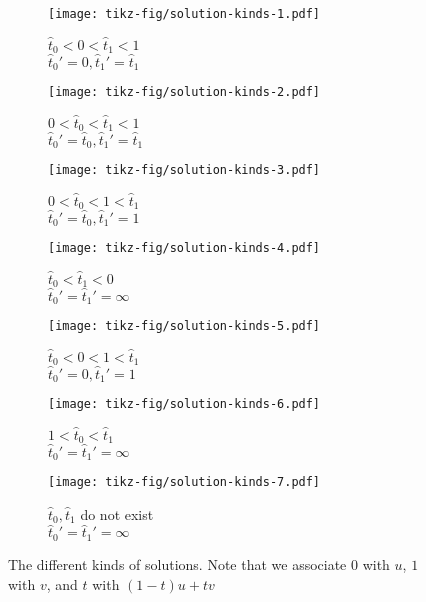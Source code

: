 \begin{figure}
    \centering
    \begin{subfigure}[t]{0.3\textwidth}
      \texttt{[image: tikz-fig/solution-kinds-1.pdf]}
      \caption{\(\hat t_0 < 0 < \hat t_1 < 1\) \\
        \(\hat t_0' = 0, \hat t_1' = \hat t_1\)}
    \end{subfigure}
    \hfill
    \begin{subfigure}[t]{0.3\textwidth}
      \texttt{[image: tikz-fig/solution-kinds-2.pdf]}
      \caption{\(0 < \hat t_0 < \hat t_1 < 1\) \\
        \(\hat t_0' = \hat t_0, \hat t_1' = \hat t_1\)}
    \end{subfigure}
    \hfill
    \begin{subfigure}[t]{0.3\textwidth}
      \texttt{[image: tikz-fig/solution-kinds-3.pdf]}
      \caption{\(0 < \hat t_0 < 1 < \hat t_1 \) \\
        \(\hat t_0' = \hat t_0, \hat t_1' = 1\)}
    \end{subfigure}

    \begin{subfigure}[t]{0.3\textwidth}
      \texttt{[image: tikz-fig/solution-kinds-4.pdf]}
      \caption{\(\hat t_0 < \hat t_1 < 0\) \\
        \(\hat t_0' = \hat t_1' = \infty\)}
    \end{subfigure}
    \hfill
    \begin{subfigure}[t]{0.3\textwidth}
      \texttt{[image: tikz-fig/solution-kinds-5.pdf]}
      \caption{\(\hat t_0 < 0 < 1 < \hat t_1\) \\
        \(\hat t_0' = 0, \hat t_1' = 1\)}
    \end{subfigure}
    \hfill
    \begin{subfigure}[t]{0.3\textwidth}
      \texttt{[image: tikz-fig/solution-kinds-6.pdf]}
      \caption{\(1 < \hat t_0 < \hat t_1\) \\
        \(\hat t_0' =  \hat t_1' = \infty\)}
    \end{subfigure}

    \begin{subfigure}[t]{0.3\textwidth}
      \texttt{[image: tikz-fig/solution-kinds-7.pdf]}
      \caption{\(\hat t_0, \hat t_1\) do not exist \\
        \(\hat t_0' = \hat t_1' = \infty\)}
    \end{subfigure}
    \caption{The different kinds of solutions. Note that we associate \(0\) with \(u\), \(1\) with \(v\), and \(t\) with \((1-t)u + tv\)}
    \label{fig:solution_kinds}
\end{figure}

